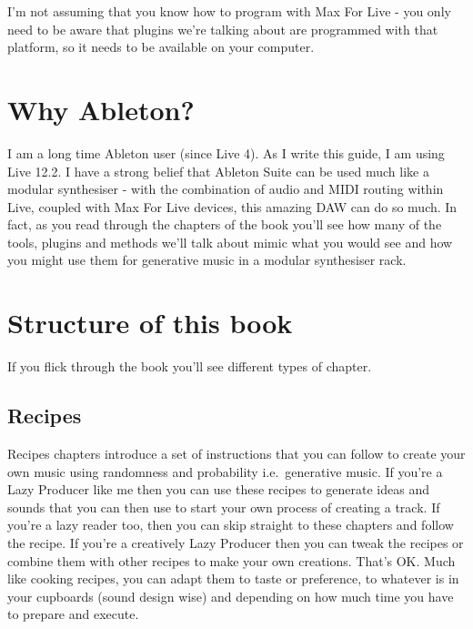 \documentclass[
  12pt,
  letterpaper,
  oneside,
  open=any]{scrbook}
\begin{document}
I'm not assuming that you know how to program with Max For Live - you
only need to be aware that plugins we're talking about are programmed
with that platform, so it needs to be available on your computer.

\section*{Why Ableton?}\label{why-ableton}


I am a long time Ableton user (since Live 4). As I write this guide, I
am using Live 12.2. I have a strong belief that Ableton Suite can be
used much like a modular synthesiser - with the combination of audio and
MIDI routing within Live, coupled with Max For Live devices, this
amazing DAW can do so much. In fact, as you read through the chapters of
the book you'll see how many of the tools, plugins and methods we'll
talk about mimic what you would see and how you might use them for
generative music in a modular synthesiser rack.

\section*{Structure of this book}\label{structure-of-this-book}


If you flick through the book you'll see different types of chapter.

\subsection*{Recipes}\label{recipes}

Recipes chapters introduce a set of instructions that you can follow to
create your own music using randomness and probability i.e.~generative
music. If you're a Lazy Producer like me then you can use these recipes
to generate ideas and sounds that you can then use to start your own
process of creating a track. If you're a lazy reader too, then you can
skip straight to these chapters and follow the recipe. If you're a
creatively Lazy Producer then you can tweak the recipes or combine them
with other recipes to make your own creations. That's OK. Much like
cooking recipes, you can adapt them to taste or preference, to whatever
is in your cupboards (sound design wise) and depending on how much time
you have to prepare and execute.
\end{document}
